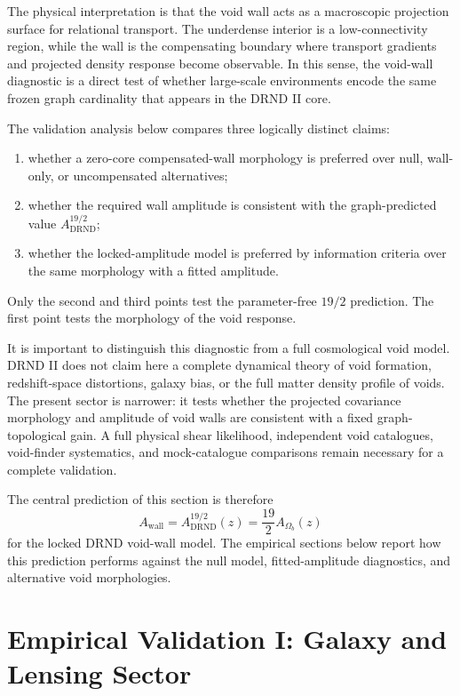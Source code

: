 \documentclass[12pt]{iopart}
\begin{document}
The physical interpretation is that the void wall acts as a macroscopic projection surface for relational transport. The underdense interior is a low-connectivity region, while the wall is the compensating boundary where transport gradients and projected density response become observable. In this sense, the void-wall diagnostic is a direct test of whether large-scale environments encode the same frozen graph cardinality that appears in the DRND II core.

The validation analysis below compares three logically distinct claims:
\begin{enumerate}
    \item whether a zero-core compensated-wall morphology is preferred over null, wall-only, or uncompensated alternatives;
    \item whether the required wall amplitude is consistent with the graph-predicted value \(A_{\mathrm{DRND}}^{19/2}\);
    \item whether the locked-amplitude model is preferred by information criteria over the same morphology with a fitted amplitude.
\end{enumerate}
Only the second and third points test the parameter-free \(19/2\) prediction. The first point tests the morphology of the void response.

It is important to distinguish this diagnostic from a full cosmological void model. DRND II does not claim here a complete dynamical theory of void formation, redshift-space distortions, galaxy bias, or the full matter density profile of voids. The present sector is narrower: it tests whether the projected covariance morphology and amplitude of void walls are consistent with a fixed graph-topological gain. A full physical shear likelihood, independent void catalogues, void-finder systematics, and mock-catalogue comparisons remain necessary for a complete validation.

The central prediction of this section is therefore
\begin{equation}
A_{\mathrm{wall}}
=
A_{\mathrm{DRND}}^{19/2}(z)
=
\frac{19}{2}A_{\Omega_b}(z)
\end{equation}
for the locked DRND void-wall model. The empirical sections below report how this prediction performs against the null model, fitted-amplitude diagnostics, and alternative void morphologies.

\section{Empirical Validation I: Galaxy and Lensing Sector}
\label{sec:validation_galaxy_lensing}
\end{document}
